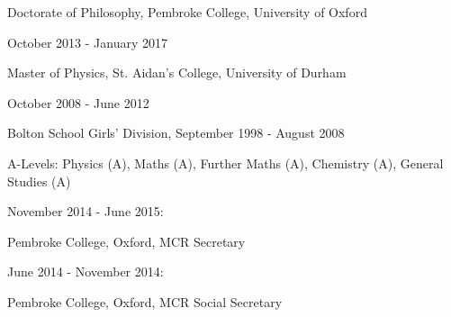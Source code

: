 \documentclass{article}
\begin{document}









\noindent\makebox[\linewidth]{\rule{0.85\paperwidth}{0.2pt}}

\smallskip

\indent Doctorate of Philosophy, Pembroke College, University of Oxford

\indent \indent October 2013 - January 2017

\smallskip

 Master of Physics, St. Aidan's College, University of Durham

\indent \indent October 2008 - June 2012

\smallskip

\indent Bolton School Girls' Division, September 1998 - August 2008

\hangindent=30pt \indent \indent A-Levels: Physics (A), Maths (A), Further Maths (A), Chemistry (A), General Studies (A)


\noindent\makebox[\linewidth]{\rule{0.85\paperwidth}{0.2pt}}


\smallskip

\indent November 2014 - June 2015:

\indent \indent Pembroke College, Oxford, MCR Secretary

\smallskip

\indent June 2014 - November 2014:

\indent \indent Pembroke College, Oxford, MCR Social Secretary

\smallskip





\noindent\makebox[\linewidth]{\rule{0.85\paperwidth}{0.2pt}}
\end{document}
